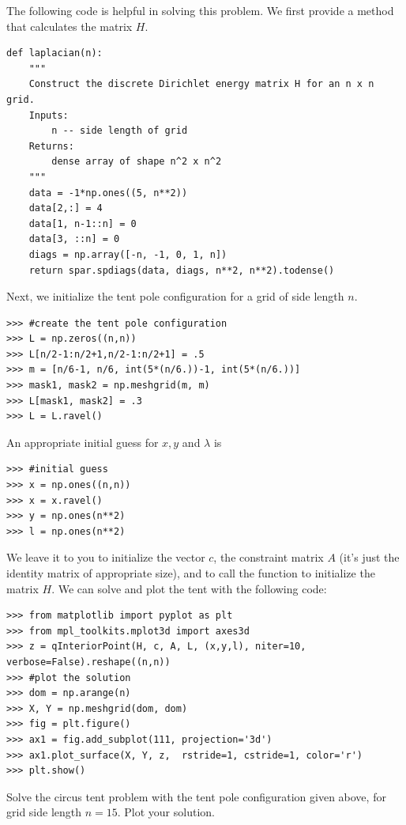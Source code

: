 The following code is helpful in solving this problem. We first provide a method that calculates the matrix $H$.
\begin{lstlisting}
def laplacian(n):
    """
    Construct the discrete Dirichlet energy matrix H for an n x n grid.
    Inputs:
        n -- side length of grid
    Returns:
        dense array of shape n^2 x n^2
    """
    data = -1*np.ones((5, n**2))
    data[2,:] = 4
    data[1, n-1::n] = 0
    data[3, ::n] = 0
    diags = np.array([-n, -1, 0, 1, n])
    return spar.spdiags(data, diags, n**2, n**2).todense()
\end{lstlisting}
Next, we initialize the tent pole configuration for a grid of side length $n$.
\begin{lstlisting}
>>> #create the tent pole configuration
>>> L = np.zeros((n,n))
>>> L[n/2-1:n/2+1,n/2-1:n/2+1] = .5
>>> m = [n/6-1, n/6, int(5*(n/6.))-1, int(5*(n/6.))]
>>> mask1, mask2 = np.meshgrid(m, m)
>>> L[mask1, mask2] = .3
>>> L = L.ravel()
\end{lstlisting}
An appropriate initial guess for $x, y$ and $\lambda$ is
\begin{lstlisting}
>>> #initial guess
>>> x = np.ones((n,n))
>>> x = x.ravel()
>>> y = np.ones(n**2)
>>> l = np.ones(n**2)
\end{lstlisting}
We leave it to you to initialize the vector $c$, the constraint matrix $A$ (it's just the identity matrix of
appropriate size), and to call the function  to initialize the matrix $H$.
We can solve and plot the tent with the following code:
\begin{lstlisting}
>>> from matplotlib import pyplot as plt
>>> from mpl_toolkits.mplot3d import axes3d
>>> z = qInteriorPoint(H, c, A, L, (x,y,l), niter=10, verbose=False).reshape((n,n))
>>> #plot the solution
>>> dom = np.arange(n)
>>> X, Y = np.meshgrid(dom, dom)
>>> fig = plt.figure()
>>> ax1 = fig.add_subplot(111, projection='3d')
>>> ax1.plot_surface(X, Y, z,  rstride=1, cstride=1, color='r')
>>> plt.show()
\end{lstlisting}

\begin{problem}
Solve the circus tent problem with the tent pole configuration given above, for grid side length $n = 15$.
Plot your solution.
\end{problem}

